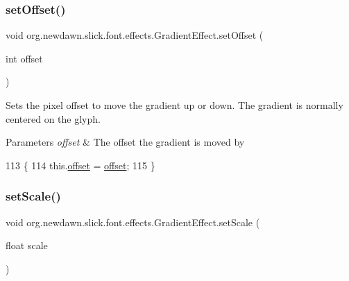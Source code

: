 \subsubsection{\texorpdfstring{set\+Offset()}{setOffset()}}
{\footnotesize\ttfamily void org.\+newdawn.\+slick.\+font.\+effects.\+Gradient\+Effect.\+set\+Offset (\begin{DoxyParamCaption}\item[{int}]{offset }\end{DoxyParamCaption})\hspace{0.3cm}{\ttfamily [inline]}}

Sets the pixel offset to move the gradient up or down. The gradient is normally centered on the glyph.


\begin{DoxyParams}{Parameters}
{\em offset} & The offset the gradient is moved by \\
\hline
\end{DoxyParams}

\begin{DoxyCode}
113                                        \{
114         this.\mbox{\hyperlink{classorg_1_1newdawn_1_1slick_1_1font_1_1effects_1_1_gradient_effect_ab518db3e9fe880bf83ce8b37ee361825}{offset}} = \mbox{\hyperlink{classorg_1_1newdawn_1_1slick_1_1font_1_1effects_1_1_gradient_effect_ab518db3e9fe880bf83ce8b37ee361825}{offset}};
115     \}
\end{DoxyCode}
\mbox{\label{classorg_1_1newdawn_1_1slick_1_1font_1_1effects_1_1_gradient_effect_a5028606f2560ae51e04a9ab1e51c36dc}} 
\subsubsection{\texorpdfstring{set\+Scale()}{setScale()}}
{\footnotesize\ttfamily void org.\+newdawn.\+slick.\+font.\+effects.\+Gradient\+Effect.\+set\+Scale (\begin{DoxyParamCaption}\item[{float}]{scale }\end{DoxyParamCaption})\hspace{0.3cm}{\ttfamily [inline]}}

